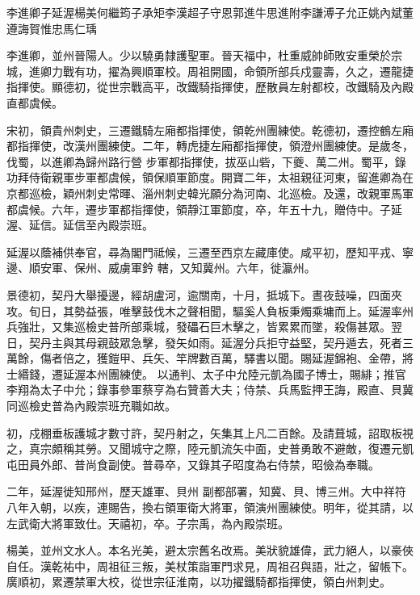 
\begin{pinyinscope}

 李進卿子延渥楊美何繼筠子承矩李漢超子守恩郭進牛思進附李謙溥子允正姚內斌董遵誨賀惟忠馬仁瑀



 李進卿，並州晉陽人。少以驍勇隸護聖軍。晉天福中，杜重威帥師敗安重榮於宗城，進卿力戰有功，擢為興順軍校。周祖開國，命領所部兵戍靈壽，久之，遷龍捷指揮使。顯德初，從世宗戰高平，改鐵騎指揮使，歷散員左射都校，改鐵騎及內殿直都虞候。



 宋初，領貴州刺史，三遷鐵騎左廂都指揮使，領乾州團練使。乾德初，遷控鶴左廂都指揮使，改漢州團練使。二年，轉虎捷左廂都指揮使，領澄州團練使。是歲冬，伐蜀，以進卿為歸州路行營
 步軍都指揮使，拔巫山砦，下夔、萬二州。蜀平，錄功拜侍衛親軍步軍都虞候，領保順軍節度。開寶二年，太祖親征河東，留進卿為在京都巡檢，穎州刺史常暉、淄州刺史韓光願分為河南、北巡檢。及還，改親軍馬軍都虞候。六年，遷步軍都指揮使，領靜江軍節度，卒，年五十九，贈侍中。子延渥、延信。延信至內殿崇班。



 延渥以蔭補供奉官，尋為閣門祗候，三遷至西京左藏庫使。咸平初，歷知平戎、寧邊、順安軍、保州、威虜軍鈐
 轄，又知冀州。六年，徙瀛州。



 景德初，契丹大舉擾邊，經胡盧河，逾關南，十月，抵城下。晝夜鼓噪，四面夾攻。旬日，其勢益張，唯擊鼓伐木之聲相聞，驅奚人負板秉燭乘墉而上。延渥率州兵強壯，又集巡檢史普所部乘城，發礧石巨木擊之，皆累累而墜，殺傷甚眾。翌日，契丹主與其母親鼓眾急擊，發矢如雨。延渥分兵拒守益堅，契丹遁去，死者三萬餘，傷者倍之，獲鎧甲、兵矢、竿牌數百萬，驛書以聞。賜延渥錦袍、金帶，將士緡錢，遷延渥本州團練使。
 以通判、太子中允陸元凱為國子博士，賜緋；推官李翔為太子中允；錄事參軍蔡亨為右贊善大夫；侍禁、兵馬監押王誨，殿直、貝冀同巡檢史普為內殿崇班充職如故。



 初，戍棚垂板護城才數寸許，契丹射之，矢集其上凡二百餘。及請葺城，詔取板視之，真宗頗稱其勞。又聞城守之際，陸元凱流矢中面，史普勇敢不避敵，復遷元凱屯田員外郎、普尚食副使。普尋卒，又錄其子昭度為右侍禁，昭儉為奉職。



 二年，延渥徙知邢州，歷天雄軍、貝州
 副都部署，知冀、貝、博三州。大中祥符八年入朝，以疾，連賜告，換右領軍衛大將軍，領演州團練使。明年，從其請，以左武衛大將軍致仕。天禧初，卒。子宗禹，為內殿崇班。



 楊美，並州文水人。本名光美，避太宗舊名改焉。美狀貌雄偉，武力絕人，以豪俠自任。漢乾祐中，周祖征三叛，美杖策詣軍門求見，周祖召與語，壯之，留帳下。廣順初，累遷禁軍大校，從世宗征淮南，以功擢鐵騎都指揮使，領白州刺史。




\end{pinyinscope}
